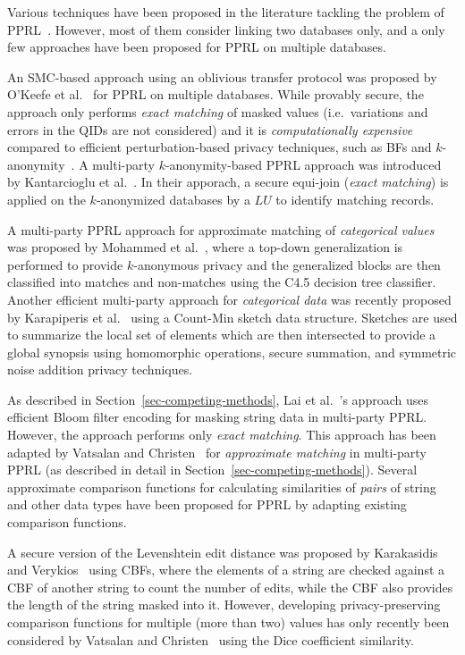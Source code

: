 \documentclass{sig-alternate}
\begin{document}
Various techniques have been proposed in the literature tackling the
problem of PPRL~\cite{Vat13}. 
However, most of them consider linking two databases only, and
a only few approaches have been proposed for PPRL
on multiple databases.

An SMC-based approach using an oblivious
transfer protocol was proposed
by O'Keefe et al.~\cite{Kee04} 
for PPRL on multiple
databases. 
While provably secure, the approach only performs \emph{exact matching}
of masked values (i.e.\ variations and errors in the QIDs
are not considered) and it is \emph{computationally
expensive} compared to efficient perturbation-based privacy techniques,
such as BFs and $k$-anonymity~\cite{Vat13}. 
A multi-party $k$-anonymity-based PPRL approach
was introduced by
Kantarcioglu et al.~\cite{Kan08}.
In their apporach, a secure equi-join (\emph{exact matching}) 
is applied on the $k$-anonymized
databases by a $LU$ to identify matching records.

A multi-party PPRL approach for approximate matching 
of \emph{categorical values} 
was proposed by Mohammed et al.~\cite{Moh11}, where a top-down generalization is
performed to provide $k$-anonymous privacy
and the generalized blocks are then classified into matches and non-matches using the
C4.5 decision tree classifier.
Another efficient multi-party approach
for \emph{categorical data} was recently proposed
by Karapiperis et al.~\cite{Kara15}
using a Count-Min 
sketch data structure.
Sketches are used to summarize
the local set of elements which are then intersected to provide a 
global synopsis using homomorphic operations, secure summation, and symmetric noise
addition privacy techniques.

As described in Section~\ref{sec-competing-methods}, Lai et al.~\cite{Lai06}'s approach
uses efficient Bloom filter encoding for masking string data
in multi-party PPRL. However, the approach 
performs only \emph{exact matching}.
This approach has been adapted by Vatsalan and 
Christen~\cite{Vat14c,Vat16c} for \emph{approximate
matching} in multi-party PPRL (as described in detail in Section~\ref{sec-competing-methods}).
Several approximate comparison functions for calculating
similarities of \emph{pairs} of string and other data types
have been proposed for PPRL 
by adapting existing comparison functions. 

A secure version of the
Levenshtein edit distance
was proposed by Karakasidis and Verykios~\cite{Kar11a} using CBFs, where
the elements of a string are checked against a CBF of another string
to count the number of edits, 
while the CBF also provides the length of the string masked into it.
However, developing privacy-preserving comparison functions for multiple 
(more than two) values has only recently been considered
by Vatsalan and Christen~\cite{Vat14c,Vat16c}
using the Dice coefficient similarity.
\end{document}
